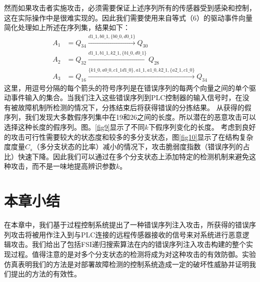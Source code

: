 然而如果攻击者实施攻击，必须需要保证上述序列所有的传感器受到感染和控制，这在实际操作中是很难实现的。因此我们需要使用来自等式（6）的驱动事件向量简化处理如上所述在序列集，结果如下：\[\begin{split} A_1&=Q_{34}\xrightarrow{d1\_1,b0\_1,\{b0\_0,d0\_1\}}Q_{30}\\A_2&=Q_{32}\xrightarrow{d1\_1,b1\_1,k2\_1,\{b1\_0,d0\_1\}}Q_{28}\\A_3&=Q_{16}\xrightarrow{\{k1\_0,a0\_0,c1\_1d1\_0\},a1\_1,a1\_0,k2\_1,\{a2\_1,c1\_0\}}Q_{34} \end{split}\]这里，用逗号分隔的每个箭头的符号序列是在错误序列的每两个向量之间的单个驱动事件输入的集合。当我们注入这些错误序列到PLC控制器的输入信号时，在没有被故障机制所检测的情况下，分拣结束后将获得错误的分拣结果。
从获得的假序列，我们发现大多数假序列集中在19和26之间的长度。所以潜在的恶意攻击可以选择这种长度的假序列。图。\ref{fig9}显示了不同$ k $下假序列变化的长度。
考虑到良好的攻击可行性需要较大的状态度和较多的多分支状态，图\ref{fig10}显示了在结构复杂度度量$ C_s $（多分支状态的比率）减小的情况下，攻击脆弱度指数（错误序列的占比）快速下降。因此我们可以通过在多个分支状态上添加特定的检测机制来避免这种攻击，而不是一味地提高辨识参数$ k $。

\section{本章小结}

在本章中，我们基于过程控制系统提出了一种错误序列注入攻击，所获得的错误序列攻击将被用作注入到与PLC连接的远程传感器接收的信号来对系统进行恶意逻辑攻击。我们给出了包括FSI递归搜索算法在内的错误序列注入攻击构建的整个实现过程。值得注意的是对多个分支状态的检测将成为对这种攻击的有效防御。实验仿真表明我们的方法是对部署故障检测的控制系统造成一定的破坏性威胁并证明我们提出的方法的有效性。

\label{sec:insertimage}

